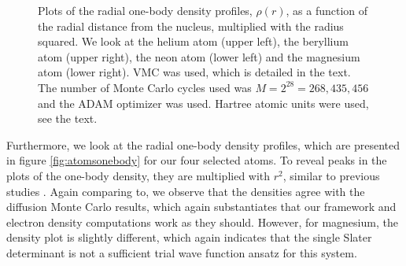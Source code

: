 \begin{figure}
	\caption{Plots of the radial one-body density profiles, $\rho(r)$, as a function of the radial distance from the nucleus, multiplied with the radius squared. We look at the helium atom (upper left), the beryllium atom (upper right), the neon atom (lower left) and the magnesium atom (lower right). VMC was used, which is detailed in the text. The number of Monte Carlo cycles used was $M=2^{28}=268,435,456$ and the ADAM optimizer was used. Hartree atomic units were used, see the text.}
	\label{fig:atomsonebody}
\end{figure}

Furthermore, we look at the radial one-body density profiles, which are presented in figure \eqref{fig:atomsonebody} for our four selected atoms. To reveal peaks in the plots of the one-body density, they are multiplied with $r^2$, similar to previous studies \supercite{hogberget_quantum_2013}. Again comparing \citet{hogberget_quantum_2013} to, we observe that the densities agree with the diffusion Monte Carlo results, which again substantiates that our framework and electron density computations work as they should. However, for magnesium, the density plot is slightly different, which again indicates that the single Slater determinant is not a sufficient trial wave function ansatz for this system.
